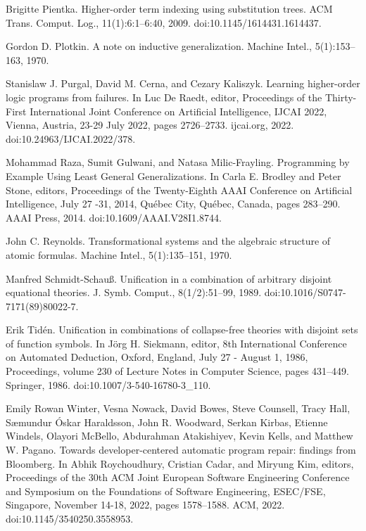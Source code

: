 \par\noindent  [37]  Brigitte Pientka.  Higher-order term indexing using substitution trees.  ACM Trans. Comput. Log., 11(1):6:1–6:40, 2009.  doi:10.1145/1614431.1614437.  
 
\par\noindent  [38]  Gordon D. Plotkin.  A note on inductive generalization.  Machine Intel., 5(1):153–163, 1970.  
 
\par\noindent  [39]  Stanislaw J. Purgal, David M. Cerna, and Cezary Kaliszyk.  Learning higher-order logic programs from failures.  In Luc De Raedt, editor, Proceedings of the Thirty-First International Joint Conference on Artificial Intelligence, IJCAI 2022, Vienna, Austria, 23-29 July 2022, pages 2726–2733. ijcai.org, 2022.  doi:10.24963/IJCAI.2022/378.  
 
\par\noindent  [40]  Mohammad Raza, Sumit Gulwani, and Natasa Milic-Frayling.  Programming by Example Using Least General Generalizations.  In Carla E. Brodley and Peter Stone, editors, Proceedings of the Twenty-Eighth AAAI Conference on Artificial Intelligence, July 27 -31, 2014, Québec City, Québec, Canada, pages 283–290. AAAI Press, 2014.  doi:10.1609/AAAI.V28I1.8744.  
 
\par\noindent  [41]  John C. Reynolds.  Transformational systems and the algebraic structure of atomic formulas.  Machine Intel., 5(1):135–151, 1970.  
 
\par\noindent  [42]  Manfred Schmidt-Schauß.  Unification in a combination of arbitrary disjoint equational theories.  J. Symb. Comput., 8(1/2):51–99, 1989.  doi:10.1016/S0747-7171(89)80022-7.  
 
\par\noindent  [43]  Erik Tidén.  Unification in combinations of collapse-free theories with disjoint sets of function symbols.  In Jörg H. Siekmann, editor, 8th International Conference on Automated Deduction, Oxford, England, July 27 - August 1, 1986, Proceedings, volume 230 of Lecture Notes in Computer Science, pages 431–449. Springer, 1986.  doi:10.1007/3-540-16780-3\_110.  
 
\par\noindent  [44]  Emily Rowan Winter, Vesna Nowack, David Bowes, Steve Counsell, Tracy Hall, Sæmundur Óskar Haraldsson, John R. Woodward, Serkan Kirbas, Etienne Windels, Olayori McBello, Abdurahman Atakishiyev, Kevin Kells, and Matthew W. Pagano.  Towards developer-centered automatic program repair: findings from Bloomberg.  In Abhik Roychoudhury, Cristian Cadar, and Miryung Kim, editors, Proceedings of the 30th ACM Joint European Software Engineering Conference and Symposium on the Foundations of Software Engineering, ESEC/FSE, Singapore, November 14-18, 2022, pages 1578–1588. ACM, 2022.  doi:10.1145/3540250.3558953.  
 
